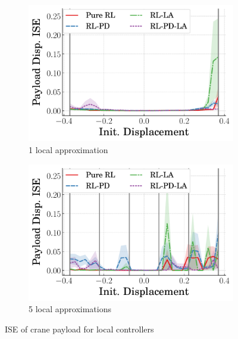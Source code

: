 \begin{figure}[t]
    \centering
    \begin{subfigure}[b]{0.49\textwidth}
        \centering
        \includegraphics[width=\textwidth]{figures/figures_Interpretability/Mean_ISE_dpcrane_cubic_1_bins/Mean_ISE_dpcrane_cubic_Payload_Disp_1_bins.pdf}
        \caption{1 local approximation}
        \label{subfig_chap5:dpcrane_payload_unclipped_approx_error_1_bins}
    \end{subfigure}
    \hfill
    \begin{subfigure}[b]{0.49\textwidth}
        \centering
        \includegraphics[width=\textwidth]{figures/figures_Interpretability/Mean_ISE_dpcrane_cubic_5_bins/Mean_ISE_dpcrane_cubic_Payload_Disp_5_bins.pdf}
        \caption{5 local approximations}
        \label{subfig_chap5:dpcrane_payload_unclipped_approx_error_5_bins}
    \end{subfigure}
       \caption{ISE of crane payload for local controllers}
       \label{fig_chap5:dpcrane_payload_unclipped_approx_error}
\end{figure}
%

